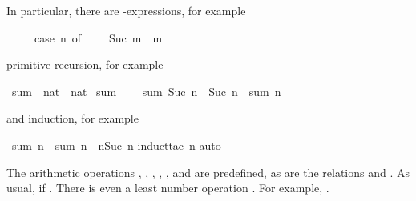 %
\begin{isabellebody}%
\def\isabellecontext{natsum}%
%
\isadelimtheory
%
\endisadelimtheory
%
\isatagtheory
%
\endisatagtheory
{\isafoldtheory}%
%
\isadelimtheory
%
\endisadelimtheory
%
\begin{isamarkuptext}%
\noindent
In particular, there are -expressions, for example
\begin{isabelle}%
\ \ \ \ \ case\ n\ of\ {}\ {\isasymRightarrow}\ {}\ {\isacharbar}\ Suc\ m\ {\isasymRightarrow}\ m%
\end{isabelle}
primitive recursion, for example%
\end{isamarkuptext}%
\isamarkuptrue%
\isamarkupfalse%
\ sum\ {\isacharcolon}{\isacharcolon}\ {\isachardoublequoteopen}nat\ {\isasymRightarrow}\ nat{\isachardoublequoteclose}\ \isanewline
{\isachardoublequoteopen}sum\ {}\ {\isacharequal}\ {}{\isachardoublequoteclose}\ {\isacharbar}\isanewline
{\isachardoublequoteopen}sum\ {\isacharparenleft}Suc\ n{\isacharparenright}\ {\isacharequal}\ Suc\ n\ {\isacharplus}\ sum\ n{\isachardoublequoteclose}%
\begin{isamarkuptext}%
\noindent
and induction, for example%
\end{isamarkuptext}%
\isamarkuptrue%
\isamarkupfalse%
\ {\isachardoublequoteopen}sum\ n\ {\isacharplus}\ sum\ n\ {\isacharequal}\ n{\isacharasterisk}{\isacharparenleft}Suc\ n{\isacharparenright}{\isachardoublequoteclose}\isanewline
%
\isadelimproof
%
\endisadelimproof
%
\isatagproof
{}\isamarkupfalse%
{\isacharparenleft}induct{\isacharunderscore}tac\ n{\isacharparenright}\isanewline
{}\isamarkupfalse%
{\isacharparenleft}auto{\isacharparenright}\isanewline
{}\isamarkupfalse%
%
\endisatagproof
{\isafoldproof}%
%
\isadelimproof
%
\endisadelimproof
%
\begin{isamarkuptext}%
\newcommand{\mystar}{*%
}
%
The arithmetic operations ,
, \isadxboldpos{\mystar}{$HOL2arithfun},
, ,  and
 are predefined, as are the relations
 and
. As usual,  if
. There is even a least number operation
\@.  For example, .

\end{isamarkuptext}
\end{isabellebody}
